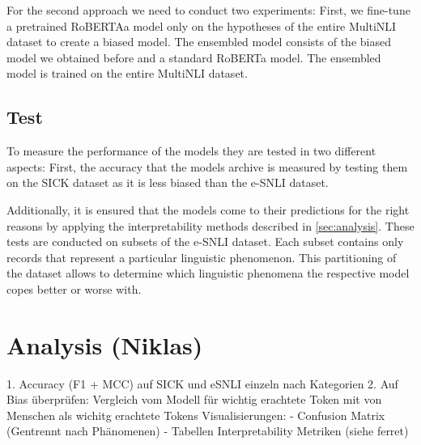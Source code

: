 \documentclass[12pt,a4paper]{article}
\begin{document}
For the second approach we need to conduct two experiments: First, we fine-tune a pretrained RoBERTAa model only on the hypotheses of the entire MultiNLI dataset to create a biased model. The ensembled model consists of the biased model we obtained before and a standard RoBERTa model. The ensembled model is trained on the entire MultiNLI dataset.

\subsection{Test}
To measure the performance of the models they are tested in two different aspects: First, the accuracy that the models archive is measured by testing them on the SICK dataset as it is less biased than the e-SNLI dataset.

Additionally, it is ensured that the models come to their predictions for the right reasons by applying the interpretability methods described in \autoref{sec:analysis}. These tests are conducted on subsets of the e-SNLI dataset. Each subset contains only records that represent a particular linguistic phenomenon. This partitioning of the dataset allows to determine which linguistic phenomena the respective model copes better or worse with.

\section{Analysis (Niklas)}
\label{sec:analysis}
1. Accuracy (F1 + MCC) auf SICK und eSNLI einzeln nach Kategorien
2. Auf Bias überprüfen: Vergleich vom Modell für wichtig erachtete Token mit von Menschen als wichitg erachtete Tokens
Visualisierungen:
- Confusion Matrix (Gentrennt nach Phänomenen)
- Tabellen Interpretability Metriken (siehe ferret)


\printbibliography
\end{document}
